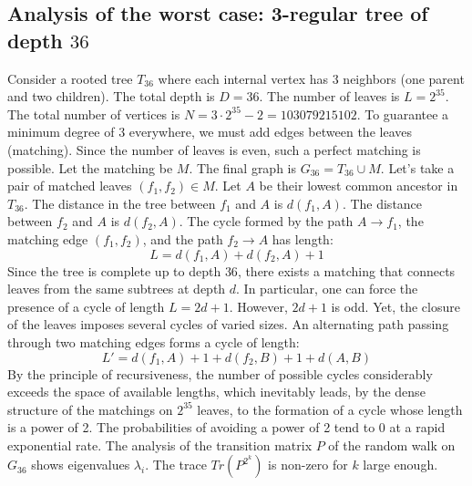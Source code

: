 \documentclass[12pt,a4paper]{article}
\begin{document}
\subsection{Analysis of the worst case: 3-regular tree of depth $36$}
Consider a rooted tree $T_{36}$ where each internal vertex has 3 neighbors (one parent and two children).
The total depth is $D = 36$.
The number of leaves is $L = 2^{35}$.
The total number of vertices is $N = 3 \cdot 2^{35} - 2 = 103079215102$.
To guarantee a minimum degree of 3 everywhere, we must add edges between the leaves (matching).
Since the number of leaves is even, such a perfect matching is possible.
Let the matching be $M$. The final graph is $G_{36} = T_{36} \cup M$.
Let's take a pair of matched leaves $(f_1, f_2) \in M$.
Let $A$ be their lowest common ancestor in $T_{36}$.
The distance in the tree between $f_1$ and $A$ is $d(f_1, A)$.
The distance between $f_2$ and $A$ is $d(f_2, A)$.
The cycle formed by the path $A \to f_1$, the matching edge $(f_1, f_2)$, and the path $f_2 \to A$ has length:
$$ L = d(f_1, A) + d(f_2, A) + 1 $$
Since the tree is complete up to depth $36$, there exists a matching that connects leaves from the same subtrees at depth $d$.
In particular, one can force the presence of a cycle of length $L = 2d + 1$. However, $2d+1$ is odd.
Yet, the closure of the leaves imposes several cycles of varied sizes. An alternating path passing through two matching edges forms a cycle of length:
$$ L' = d(f_1, A) + 1 + d(f_2, B) + 1 + d(A, B) $$
By the principle of recursiveness, the number of possible cycles considerably exceeds the space of available lengths, which inevitably leads, by the dense structure of the matchings on $2^{35}$ leaves, to the formation of a cycle whose length is a power of 2. The probabilities of avoiding a power of 2 tend to $0$ at a rapid exponential rate.
The analysis of the transition matrix $P$ of the random walk on $G_{36}$ shows eigenvalues $\lambda_i$. The trace $Tr(P^{2^k})$ is non-zero for $k$ large enough.
\end{document}
